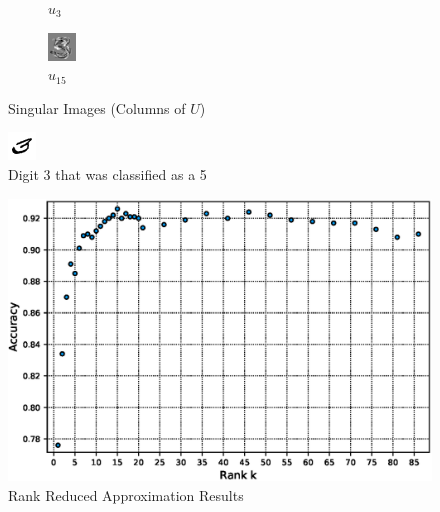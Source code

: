 \documentclass[a4paper]{article}
\begin{document}
\begin{figure}[H]
\begin{subfigure}[b]{0.22\textwidth}
                \caption{$u_3$}
                \label{fig:fourth3}
        \end{subfigure}\hfill
        \begin{subfigure}[b]{0.22\textwidth}
                \centering
                \includegraphics[width=\linewidth]{tenth3}
                \caption{$u_{15}$}
                \label{fig:tenth3}
        \end{subfigure}
        \caption{Singular Images (Columns of $U$)}\label{fig:components}
\end{figure}



\begin{figure}[H]
\centering
\includegraphics[scale=3]{bad3}
\caption{Digit 3 that was classified as a 5}
\end{figure}


\begin{figure}[H]
\centering
\includegraphics[scale=0.5]{rankAccuracy}
\caption{Rank Reduced Approximation Results}
\end{figure}
\end{document}
